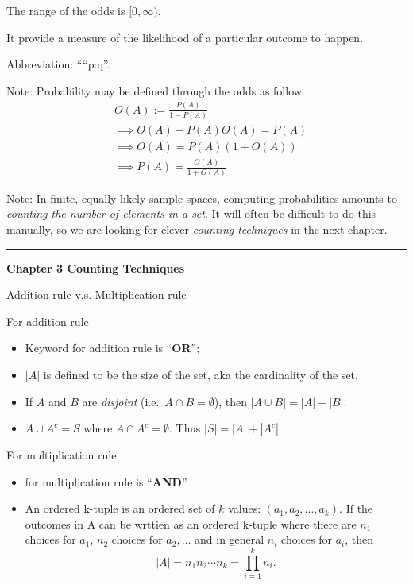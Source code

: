 \documentclass[
]{book}
\providecommand{\tightlist}{%
  \setlength{\itemsep}{0pt}\setlength{\parskip}{0pt}}
\theoremstyle{definition}
\theoremstyle{definition}
\theoremstyle{definition}
\theoremstyle{definition}
\theoremstyle{remark}
\begin{document}
The range of the odds is \([0,\infty)\).

It provide a measure of the likelihood of a particular outcome to happen.

Abbreviation: ````p:q''.

Note: Probability may be defined through the odds as follow.
\begin{align*}
  &O(A) := \frac{P(A)}{1-P(A)} \\
  &\implies O(A) - P(A)O(A) = P(A) \\
  &\implies O(A) = P(A) (1+O(A)) \\
  &\implies P(A) = \frac{O(A)} {1+O(A)}
\end{align*}

Note: In finite, equally likely sample spaces, computing probabilities amounts to \emph{counting the number of elements in a set}. It will often be difficult to do this manually, so we are looking for clever \emph{counting techniques} in the next chapter.

\begin{center}\rule{0.5\linewidth}{0.5pt}\end{center}

\textbf{Chapter 3 Counting Techniques}

Addition rule v.s. Multiplication rule

For addition rule

\begin{itemize}
\tightlist
\item
  Keyword for addition rule is ``\textbf{OR}'';
\item
  \(|A|\) is defined to be the size of the set, aka the cardinality of the set.
\item
  If \(A\) and \(B\) are \emph{disjoint} (i.e.~\(A\cap B = \emptyset\)), then \(|A\cup B| = |A| + |B|\).
\item
  \(A\cup A^c = S\) where \(A \cap A^c = \emptyset\). Thus \(|S|=|A|+|A^c|\).
\end{itemize}

For multiplication rule

\begin{itemize}
\tightlist
\item
  for multiplication rule is ``\textbf{AND}''
\item
  An ordered k-tuple is an ordered set of \(k\) values: \((a_1,a_2,\dots,a_k)\). If the outcomes in A can be wrttien as an ordered k-tuple where there are \(n_1\) choices for \(a_1\), \(n_2\) choices for \(a_2,\dots\) and in general \(n_i\) choices for \(a_i\), then
  \[
  |A| = n_1n_2\cdots n_k = \prod_{i=1}^k n_i.
    \]
\end{itemize}
\end{document}
